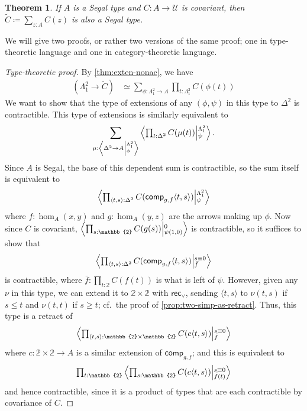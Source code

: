 \documentclass{amsart}
\theoremstyle{plain}
\newtheorem{thm}{Theorem}[section]
\theoremstyle{definition}
\theoremstyle{remark}
\numberwithin{equation}{section}
\newcommand{\tprod}{\textstyle\prod}
\newcommand{\tsum}{\textstyle\sum}
\newcommand{\exten}[4]{\left\langle\mathchoice{\textstyle\prod_{#1}}{\textstyle\prod_{#1}}{\scriptstyle\prod_{#1}}{\scriptscriptstyle\prod_{#1}} #2 \middle|^{#3}_{#4}\right\rangle}
\newcommand{\ndexten}[4]{\left\langle #1 \to #2 \middle|^{#3}_{#4}\right\rangle}
\newcommand{\jdeq}{\equiv}
\newcommand{\defeq}{\coloneqq}
\newcommand{\univtype}{\mathcal{U}}
\newcommand{\pair}[1]{\langle #1\rangle}
\newcommand{\rec}{\mathsf{rec}}
\newcommand{\two}{\mathbb{2}}
\newcommand{\iscomp}[2]{\mathsf{comp}_{#1,#2}}
\begin{document}
\begin{thm}\label{thm:covariant-segal}
  If $A$ is a Segal type and $C:A\to\univtype$ is covariant, then $\tilde C \defeq \sum_{z:A} C(z)$ is also a Segal type.
\end{thm}
We will give two proofs, or rather two versions of the same proof; one in type-theoretic language and one in category-theoretic language.
\begin{proof}[Type-theoretic proof]
  By \cref{thm:exten-nonac}, we have
  \begin{align*}
    (\Lambda^2_1 \to \tilde C)
    &\simeq \tsum_{\phi:\Lambda^2_1 \to A} \tprod_{t:\Lambda^2_1} C(\phi(t))
  \end{align*}
  We want to show that the type of extensions of any $(\phi,\psi)$ in this type to $\Delta^2$ is contractible.
  This type of extensions is similarly equivalent to
  \[ \sum_{\mu:\ndexten{\Delta^2}{A}{\Lambda^2_1}{\phi}} \exten{t:\Delta^2}{C(\mu(t))}{\Lambda^2_1}{\psi}. \]
  Since $A$ is Segal, the base of this dependent sum is contractible, so the sum itself is equivalent to
  \[ \exten{\pair{t,s}:\Delta^2}{C(\iscomp g f\pair{t,s})}{\Lambda^2_1}{\psi} \]
  where $f:\hom_A(x,y)$ and $g:\hom_A(y,z)$ are the arrows making up $\phi$.
  Now since $C$ is covariant, $\exten{s:\two}{C(g(s))}{0}{\psi(1,0)}$ is contractible, so it suffices to show that
  \[ \exten{\pair{t,s}:\Delta^2}{C(\iscomp g f\pair{t,s})}{s\jdeq 0}{\bar f} \]
  is contractible, where $\bar f : \tprod_{t:\two} C(f(t))$ is what is left of $\psi$.
  However, given any $\nu$ in this type, we can extend it to $\two\times\two$ with $\rec_\lor$, sending $\pair{t,s}$ to $\nu(t,s)$ if $s\le t$ and $\nu(t,t)$ if $s\ge t$; cf.~the proof of \cref{prop:two-simp-as-retract}.
  Thus, this type is a retract of 
  \[ \exten{\pair{t,s}:\two\times\two}{C(c\pair{t,s})}{s\jdeq 0}{\bar f} \]
  where $c:\two\times\two\to A$ is a similar extension of $\iscomp g f$; and this is equivalent to
  \[ \tprod_{t:\two}\exten{s:\two}{C(c\pair{t,s})}{s\jdeq 0}{\bar f(t)} \]
  and hence contractible, since it is a product of types that are each contractible by covariance of $C$.
\end{proof}
\end{document}
